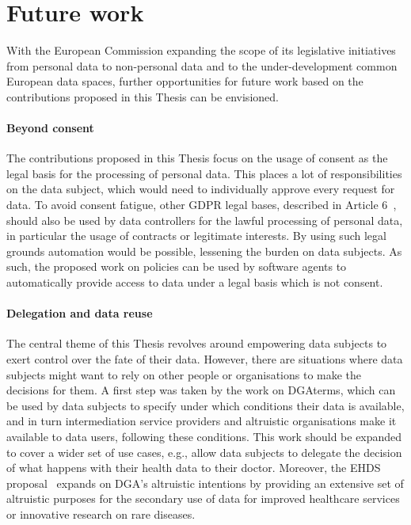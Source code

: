 \section{Future work}
\label{sec:future_work}

With the European Commission expanding the scope of its legislative initiatives from personal data to non-personal data and to the under-development common European data spaces, further opportunities for future work based on the contributions proposed in this Thesis can be envisioned.

\paragraph{Beyond consent} The contributions proposed in this Thesis focus on the usage of consent as the legal basis for the processing of personal data. This places a lot of responsibilities on the data subject, which would need to individually approve every request for data. To avoid consent fatigue, other GDPR legal bases, described in Article 6~\citeyearpar{noauthor_regulation_2016}, should also be used by data controllers for the lawful processing of personal data, in particular the usage of contracts or legitimate interests. By using such legal grounds automation would be possible, lessening the burden on data subjects. As such, the proposed work on policies can be used by software agents to automatically provide access to data under a legal basis which is not consent.

\paragraph{Delegation and data reuse} The central theme of this Thesis revolves around empowering data subjects to exert control over the fate of their data. However, there are situations where data subjects might want to rely on other people or organisations to make the decisions for them. A first step was taken by the work on DGAterms, which can be used by data subjects to specify under which conditions their data is available, and in turn intermediation service providers and altruistic organisations make it available to data users, following these conditions. This work should be expanded to cover a wider set of use cases, e.g., allow data subjects to delegate the decision of what happens with their health data to their doctor. Moreover, the EHDS proposal~\citeyearpar{noauthor_proposal_2022} expands on DGA's altruistic intentions by providing an extensive set of altruistic purposes for the secondary use of data for improved healthcare services or innovative research on rare diseases.


